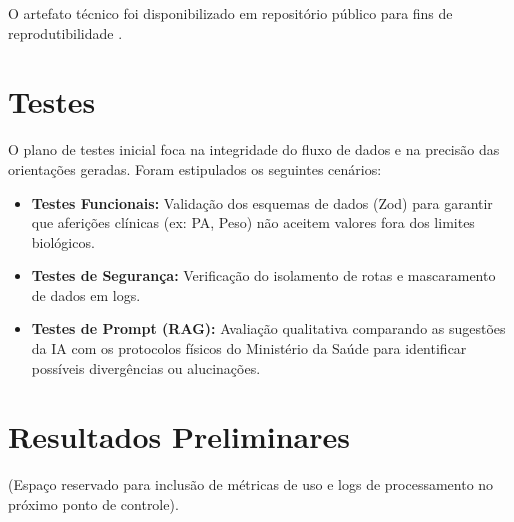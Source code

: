 \documentclass[12pt]{article}
\begin{document}
O artefato técnico foi disponibilizado em repositório público para fins de reprodutibilidade \cite{Zegrine2026}.

\section{Testes}
O plano de testes inicial foca na integridade do fluxo de dados e na precisão das orientações geradas. Foram estipulados os seguintes cenários:
\begin{itemize}
    \item \textbf{Testes Funcionais:} Validação dos esquemas de dados (Zod) para garantir que aferições clínicas (ex: PA, Peso) não aceitem valores fora dos limites biológicos.
    \item \textbf{Testes de Segurança:} Verificação do isolamento de rotas e mascaramento de dados em logs.
    \item \textbf{Testes de Prompt (RAG):} Avaliação qualitativa comparando as sugestões da IA com os protocolos físicos do Ministério da Saúde para identificar possíveis divergências ou alucinações.
\end{itemize}

\section{Resultados Preliminares}
(Espaço reservado para inclusão de métricas de uso e logs de processamento no próximo ponto de controle).




\end{document}
